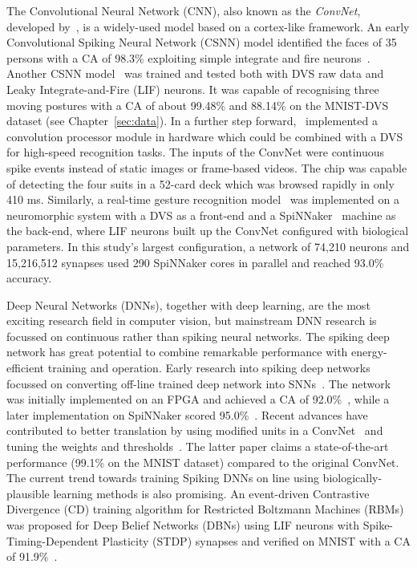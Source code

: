 \documentclass{frontiersENG} %
\begin{document}
The Convolutional Neural Network (CNN), also known as the \textit{ConvNet}, developed by~\cite{lecun1998gradient}, is a widely-used model based on a cortex-like framework.
An early Convolutional Spiking Neural Network (CSNN) model identified the faces of 35 persons with a CA of 98.3\% exploiting simple integrate and fire neurons~\citep{matsugu2002convolutional}.
Another CSNN model~\citep{zhao2014feedforward} was trained and tested both with DVS raw data and Leaky Integrate-and-Fire (LIF) neurons.
It was capable of recognising three moving postures with a CA of about 99.48\% and 88.14\% on the MNIST-DVS dataset (see Chapter~\ref{sec:data}).
In a further step forward,~\cite{camunas2012event} implemented a convolution processor module in hardware which could be combined with a DVS for high-speed recognition tasks.
The inputs of the ConvNet were continuous spike events instead of static images or frame-based videos. 
The chip was capable of detecting the four suits in a 52-card deck which was browsed rapidly in only 410 ms.
Similarly, a real-time gesture recognition model~\citep{liu2014real} was implemented on a neuromorphic system with a DVS as a front-end and a SpiNNaker~\citep{furber2014spinnaker} machine as the back-end, where LIF neurons built up the ConvNet configured with biological parameters.
In this study's largest configuration, a network of 74,210 neurons and 15,216,512 synapses used 290 SpiNNaker cores in parallel and reached 93.0\% accuracy. 

Deep Neural Networks (DNNs), together with deep learning, are the most exciting research field in computer vision, but mainstream DNN research is focussed on continuous rather than spiking neural networks.
The spiking deep network has great potential to combine remarkable performance with energy-efficient training and operation.
Early research into spiking deep networks focussed on converting off-line trained deep network into SNNs~\citep{o2013real}.
The network was initially implemented on an FPGA and achieved a CA of 92.0\%~\citep{neil2014minitaur}, while a later implementation on SpiNNaker scored 95.0\%~\citep{Stromatias2015scalable}.
Recent advances have contributed to better translation by using modified units in a ConvNet~\citep{cao2015spiking} and tuning the weights and thresholds~\citep{Diehl2015fast}.
The latter paper claims a state-of-the-art performance (99.1\% on the MNIST dataset) compared to the original ConvNet.
The current trend towards training Spiking DNNs on line using biologically-plausible learning methods is also promising.
An event-driven Contrastive Divergence (CD) training algorithm for Restricted Boltzmann Machines (RBMs) was proposed for Deep Belief Networks (DBNs) using LIF neurons with Spike-Timing-Dependent Plasticity (STDP) synapses and verified on MNIST with a CA of 91.9\%~\citep{neftci2013event}.
\end{document}
